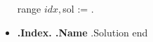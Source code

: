 \documentclass[a4paper,11pt]{article}
\begin{document}
\begin{flushleft}
\begin{multicols}{3}
\begin{itemize}
\setlength\itemsep{-1pt}
{{range $idx, $sol := .}}
  \item[]\textbf{ {{.Index}}. {{.Name}} } {{.Solution}}
{{end}}
\end{itemize}  
\end{multicols}
\end{flushleft}
\end{document}
